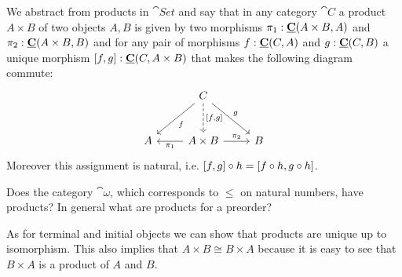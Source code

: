 We abstract from products in $\cat{Set}$ and say that in any category $\cat{C}$ a product $A \times B$ of two objects $A,B$ is given by two morphisms $\pi_1 : \underline{\mathbf{C}}(A\times B,A)$ and $\pi_2 : \underline{\mathbf{C}}(A\times B,B)$ and for any pair of morphisms $f:\underline{\mathbf{C}}(C,A)$ and 
$g : \underline{\mathbf{C}}(C,B)$ a unique morphism $[f,g] : \underline{\mathbf{C}}(C,A \times B)$ that makes the following diagram commute:
\[\begin{tikzcd}[row sep = large]
& C \arrow[dl,"f"] \arrow[d, dashrightarrow,"\pair{f}{g}"] \arrow[dr,"g"]\\
A & A \times B \arrow[r,"\pi_2"] \arrow[l,"\pi_1"]& B
\end{tikzcd}\]
Moreover this assignment is natural, i.e. $[f,g] \circ h = [f\circ h,g\circ h]$.

\begin{question}
  Does the category $\cat{\omega}$, which corresponds to $\leq$ on natural numbers, have products? In general what are products for a preorder?
\end{question}

As for terminal and initial objects we can show that products are unique up to isomorphism. This also implies that  $A\times B \cong B \times A$ because it is easy to see that $B\times A$ is a product of $A$ and $B$.

